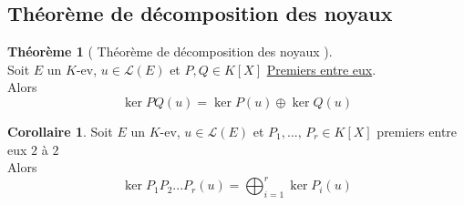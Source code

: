 \documentclass[10pt,a4paper]{article}
\theoremstyle{definition}
\newtheorem{theorem}[proposition]{Théorème}
\newtheorem{corollaire}[proposition]{Corollaire}
\begin{document}
\subsection{Théorème de décomposition des noyaux}
\begin{theorem}[ Théorème de décomposition des noyaux ]
\hfill \\
Soit $E$ un $K$-ev, $u \in \mathcal{L}(E)$ et $P, Q \in K[X]$ \uline{Premiers entre eux}. \\
Alors
\[ \boxed{\ker PQ(u) = \ker P(u) \oplus \ker Q(u)} \]
\end{theorem}
\begin{corollaire}
Soit $E$ un $K$-ev, $u \in \mathcal{L}(E)$ et $P_1, ...,\, P_r \in K[X]$ premiers entre eux $2$ à $2$ \\
Alors 
\[ \boxed{ \ker P_1 P_2 ... P_r(u) = \bigoplus_{i = 1}^r \ker P_i(u)} \]
\end{corollaire}
\end{document}
